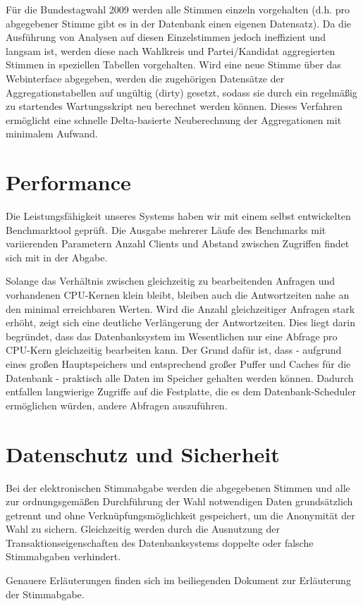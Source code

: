 \documentclass[11pt,a4paper,DIV11,ngerman]{scrartcl}
\begin{document}
Für die Bundestagwahl 2009 werden alle Stimmen einzeln vorgehalten (d.h. pro abgegebener Stimme gibt es in der Datenbank einen eigenen Datensatz). Da die Ausführung von Analysen auf diesen Einzelstimmen jedoch ineffizient und langsam ist, werden diese nach Wahlkreis und Partei/Kandidat aggregierten Stimmen in speziellen Tabellen vorgehalten. Wird eine neue Stimme über das Webinterface abgegeben, werden die zugehörigen Datensätze der Aggregationstabellen auf ungültig (dirty) gesetzt, sodass sie durch ein regelmäßig zu startendes Wartungsskript neu berechnet werden können. Dieses Verfahren ermöglicht eine schnelle Delta-basierte Neuberechnung der Aggregationen mit minimalem Aufwand. 


\section{Performance}
Die Leistungsfähigkeit unseres Systems haben wir mit einem selbst entwickelten Benchmarktool geprüft.
Die Ausgabe mehrerer Läufe des Benchmarks mit variierenden Parametern Anzahl Clients und Abstand zwischen Zugriffen findet sich mit in der Abgabe.

Solange das Verhältnis zwischen gleichzeitig zu bearbeitenden Anfragen und vorhandenen CPU-Kernen klein bleibt, bleiben auch die Antwortzeiten nahe an den minimal erreichbaren Werten. Wird die Anzahl gleichzeitiger Anfragen stark erhöht, zeigt sich eine deutliche Verlängerung der Antwortzeiten. Dies liegt darin begründet, dass das Datenbanksystem im Wesentlichen nur eine Abfrage pro CPU-Kern gleichzeitig bearbeiten kann. Der Grund dafür ist, dass - aufgrund eines großen Hauptspeichers und entsprechend großer Puffer und Caches für die Datenbank - praktisch alle Daten im Speicher gehalten werden können. Dadurch entfallen langwierige Zugriffe auf die Festplatte, die es dem Datenbank-Scheduler ermöglichen würden, andere Abfragen auszuführen.



\section{Datenschutz und Sicherheit}
Bei der elektronischen Stimmabgabe werden die abgegebenen Stimmen und alle zur ordnungsgemäßen Durchführung der Wahl notwendigen Daten grundsätzlich getrennt und ohne Verknüpfungsmöglichkeit gespeichert, um die Anonymität der Wahl zu sichern. Gleichzeitig werden durch die Ausnutzung der Transaktionseigenschaften des Datenbanksystems doppelte oder falsche Stimmabgaben verhindert.

Genauere Erläuterungen finden sich im beiliegenden Dokument zur Erläuterung der Stimmabgabe.
\end{document}
